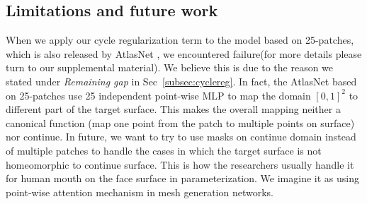 \subsection{Limitations and future work}
When we apply our cycle regularization term to the model based on 25-patches, which is also released by AtlasNet \cite{atlasnet}, we encountered failure(for more details please turn to our supplemental material). We believe this is due to the reason we stated under \emph{Remaining gap} in Sec~\ref{subsec:cyclereg}. In fact, the AtlasNet based on 25-patches use 25 independent point-wise MLP to map the domain $[0,1]^2$ to different part of the target surface. This makes the overall mapping neither a canonical function (map one point from the patch to multiple points on surface) nor continue. In future, we want to try to use masks on continue domain instead of multiple patches to handle the cases in which the target surface is not homeomorphic to continue surface. This is how the researchers usually handle it for human mouth on the face surface in parameterization. We imagine it as using point-wise attention mechanism in mesh generation networks.